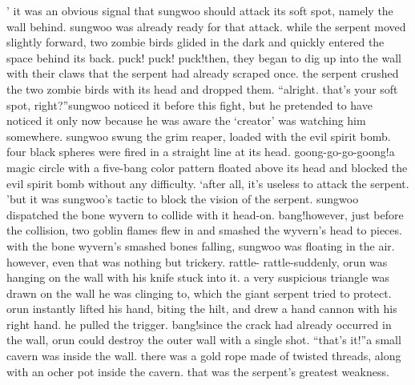 ’
it was an obvious signal that sungwoo should attack its soft spot, namely the wall behind.
sungwoo was already ready for that attack.
while the serpent moved slightly forward, two zombie birds glided in the dark and quickly entered the space behind its back.
puck! puck! puck!then, they began to dig up into the wall with their claws that the serpent had already scraped once.
 the serpent crushed the two zombie birds with its head and dropped them.
“alright.
 that’s your soft spot, right?”sungwoo noticed it before this fight, but he pretended to have noticed it only now because he was aware the ‘creator’ was watching him somewhere.
sungwoo swung the grim reaper, loaded with the evil spirit bomb.
 four black spheres were fired in a straight line at its head.
goong-go-go-goong!a magic circle with a five-bang color pattern floated above its head and blocked the evil spirit bomb without any difficulty.
‘after all, it’s useless to attack the serpent.
’but it was sungwoo’s tactic to block the vision of the serpent.
sungwoo dispatched the bone wyvern to collide with it head-on.
bang!however, just before the collision, two goblin flames flew in and smashed the wyvern’s head to pieces.
 with the bone wyvern’s smashed bones falling, sungwoo was floating in the air.
however, even that was nothing but trickery.
rattle- rattle-suddenly, orun was hanging on the wall with his knife stuck into it.
 a very suspicious triangle was drawn on the wall he was clinging to, which the giant serpent tried to protect.
orun instantly lifted his hand, biting the hilt, and drew a hand cannon with his right hand.
 he pulled the trigger.
bang!since the crack had already occurred in the wall, orun could destroy the outer wall with a single shot.
“that’s it!”a small cavern was inside the wall.
 there was a gold rope made of twisted threads, along with an ocher pot inside the cavern.
that was the serpent’s greatest weakness.

